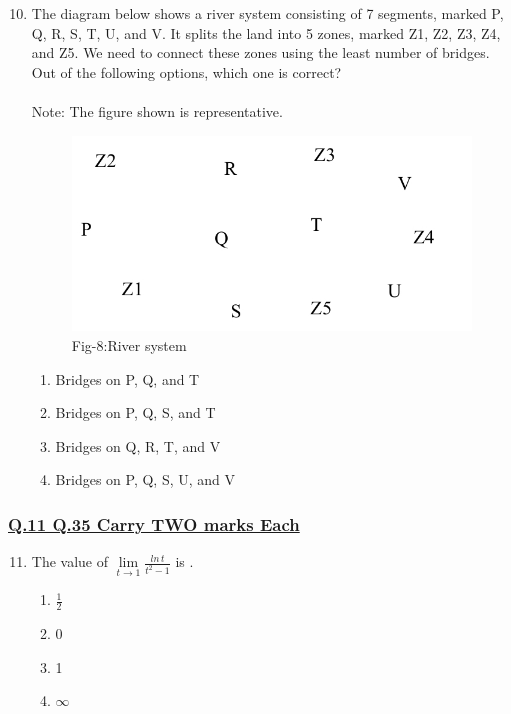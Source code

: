 \documentclass[journal]{IEEEtran}
\theoremstyle{remark}
\begin{document}
\begin{enumerate}[itemsep=1em]
\setcounter{enumi}{9}
\item The diagram below shows a river system consisting of 7 segments, marked P, Q, R, S, T, U, and V. It splits the land into 5 zones, marked Z1, Z2, Z3, Z4, and Z5. We need to connect these zones using the least number of bridges. Out of the following options, which one is correct? \\
\\
Note: The figure shown is representative. 
\begin{figure}[H]
    \centering
    \includegraphics[width=0.4\columnwidth]{figs/fig-8.jpeg}
    \caption*{Fig-8:River system}
    \label{fig:8}
\end{figure}
\begin{enumerate}[leftmargin=2.5em, labelsep=0.5em, itemsep=0.5em]
    \item Bridges on P, Q, and T 
    \item Bridges on P, Q, S, and T 
    \item Bridges on Q, R, T, and V 
    \item Bridges on P, Q, S, U, and V 
\end{enumerate}
\end{enumerate}

\subsubsection{\underline{Q.11 \text{-} Q.35 Carry TWO marks Each}}
\setlength{\parskip}{1em}

\begin{enumerate}[itemsep=1em]
\setcounter{enumi}{10}
    \item The value of $\lim\limits_{t \to 1}\frac{ln\,t}{t^2-1}$ is \underline{\hspace{0.5cm}}.

\begin{multicols}{4}
\begin{enumerate}
    \item $\frac{1}{2}$
    \item 0
    \item 1
    \item $\infty$
\end{enumerate}
\end{multicols}
\end{enumerate}
\end{document}
